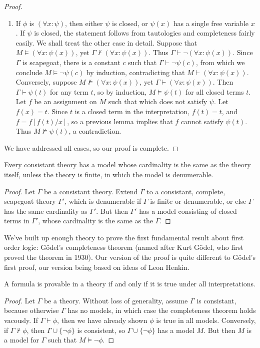 \begin{proof}
\begin{enumerate}
        \item If $\phi$ is $(\forall x: \psi)$, then either $\psi$ is closed, or $\psi(x)$ has a single free variable $x$. If $\psi$ is closed, the statement follows from tautologies and completeness fairly easily. We shall treat the other case in detail. Suppose that $M \vDash (\forall x: \psi(x))$, yet $\Gamma \not \vdash (\forall x: \psi(x))$. Thus $\Gamma \vdash \neg (\forall x: \psi(x))$. Since $\Gamma$ is scapegoat, there is a constant $c$ such that $\Gamma \vdash \neg \psi(c)$, from which we conclude $M \vDash \neg \psi(c)$ by induction, contradicting that $M \vdash (\forall x: \psi(x))$. Conversely, suppose $M \not \vDash (\forall x: \psi(x))$, yet $\Gamma \vdash (\forall x: \psi(x))$. Then $\Gamma \vdash \psi(t)$ for any term $t$, so by induction, $M \vDash \psi(t)$ for all closed terms $t$. Let $f$ be an assignment on $M$ such that which does not satisfy $\psi$. Let $f(x) = t$. Since $t$ is a closed term in the interpretation, $f(t) = t$, and $f = f[f(t)/x]$, so a previous lemma implies that $f$ cannot satisfy $\psi(t)$. Thus $M \not \vDash \psi(t)$, a contradiction.
    \end{enumerate}
    We have addressed all cases, so our proof is complete.
\end{proof}

\begin{theorem}
    Every consistant theory has a model whose cardinality is the same as the theory itself, unless the theory is finite, in which the model is denumerable.
\end{theorem}
\begin{proof}
    Let $\Gamma$ be a consistant theory. Extend $\Gamma$ to a consistant, complete, scapegoat theory $\Gamma'$, which is denumerable if $\Gamma$ is finite or denumerable, or else $\Gamma$ has the same cardinality as $\Gamma'$. But then $\Gamma'$ has a model consisting of closed terms in $\Gamma'$, whose cardinality is the same as the $\Gamma$.
\end{proof}

We've built up enough theory to prove the first fundamental result about first order logic: G\"{o}del's completeness theorem (named after Kurt G\"{o}del, who first proved the theorem in 1930). Our version of the proof is quite different to G\"{o}del's first proof, our version being based on ideas of Leon Henkin.

\begin{theorem}
    A formula is provable in a theory if and only if it is true under all interpretations.
\end{theorem}
\begin{proof}
    Let $\Gamma$ be a theory. Without loss of generality, assume $\Gamma$ is consistant, because otherwise $\Gamma$ has no models, in which case the completeness theorem holds vacously. If $\Gamma \vdash \phi$, then we have already shown $\phi$ is true in all models. Conversely, if $\Gamma \not \vdash \phi$, then $\Gamma \cup \{ \neg \phi \}$ is consistent, so $\Gamma \cup \{ \neg \phi \}$ has a model $M$. But then $M$ is a model for $\Gamma$ such that $M \vDash \neg \phi$.
\end{proof}

